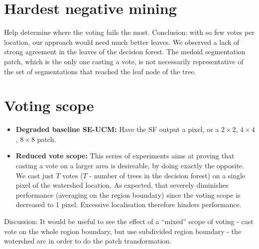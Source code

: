 \section{Hardest negative mining}
Help determine where the voting fails the most. Conclusion: with so few votes per location, our approach would need much better leaves. We observed a lack of strong agreement in the leaves of the decision forest. The medoid segmentation patch, which is the only one casting a vote, is not necessarily representative of the set of segmentations that reached the leaf node of the tree.

\section{Voting scope}
  \begin{itemize}
    \item{\bf Degraded baseline SE-UCM:} Have the SF output a pixel, or a $2\times2$, $4\times4$, $8\times8$ patch.
    \item{\bf Reduced vote scope:} This series of experiments aims at proving that casting a vote on a larger area is desireable, by doing exactly the opposite. We cast just $T$ votes ($T$ - number of trees in the decision forest) on a single pixel of the watershed location. As expected, that severely diminishes performance (\wrt averaging on the region boundary) since the voting scope is decreased to 1 pixel. Excessive localisation therefore hinders performance.
  \end{itemize}
Discussion: It would be useful to see the effect of a ``mixed'' scope of voting - cast vote on the whole region boundary, but use subdivided region boundary - the watershed arc in order to do the patch transformation.

